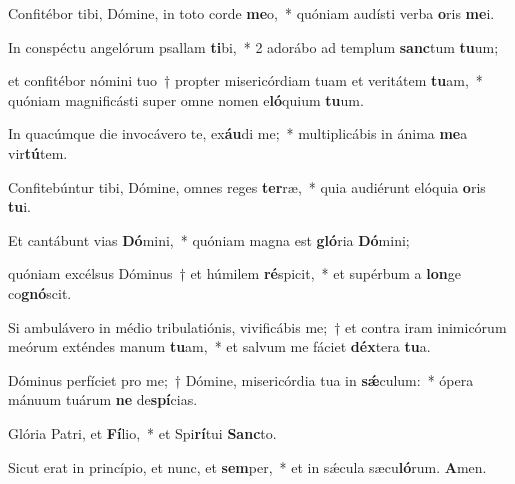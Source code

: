 \item Confitébor tibi, Dómine, in toto corde \textbf{me}o,~* quóniam audísti verba \textbf{o}ris \textbf{me}i.

\item In conspéctu angelórum psallam \textbf{ti}bi,~* 2 adorábo ad templum \textbf{sanc}tum \textbf{tu}um;

\item et confitébor nómini tuo~† propter misericórdiam tuam et veritátem \textbf{tu}am,~* quóniam magnificásti super omne nomen e\textbf{ló}quium \textbf{tu}um.

\item In quacúmque die invocávero te, ex\textbf{áu}di me;~* multiplicábis in ánima \textbf{me}a vir\textbf{tú}tem.

\item Confitebúntur tibi, Dómine, omnes reges \textbf{ter}ræ,~* quia audiérunt elóquia \textbf{o}ris \textbf{tu}i.

\item Et cantábunt vias \textbf{Dó}mini,~* quóniam magna est \textbf{gló}ria \textbf{Dó}mini;

\item quóniam excélsus Dóminus~† et húmilem \textbf{ré}spicit,~* et supérbum a \textbf{lon}ge co\textbf{gnó}scit.

\item Si ambulávero in médio tribulatiónis, vivificábis me;~† et contra iram inimicórum meórum exténdes manum \textbf{tu}am,~* et salvum me fáciet \textbf{déx}tera \textbf{tu}a.

\item Dóminus perfíciet pro me;~† Dómine, misericórdia tua in \textbf{sǽ}culum:~* ópera mánuum tuárum \textbf{ne} de\textbf{spí}cias.

\item Glória Patri, et \textbf{Fí}lio,~* et Spi\textbf{rí}tui \textbf{Sanc}to.

\item Sicut erat in princípio, et nunc, et \textbf{sem}per,~* et in sǽcula sæcu\textbf{ló}rum. \textbf{A}men.